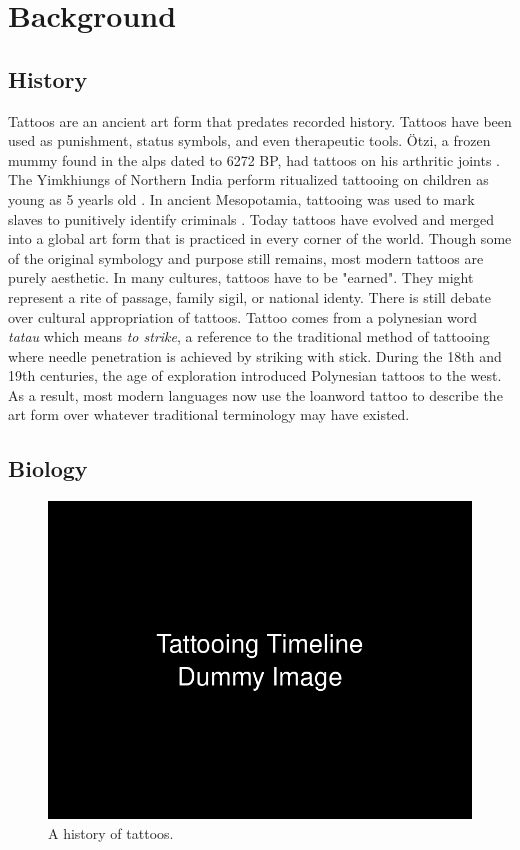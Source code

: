 \documentclass[11pt]{article}
\begin{document}
\section{Background}

\subsection{History}

Tattoos are an ancient art form that predates recorded history.
Tattoos have been used as punishment, status symbols, and even therapeutic tools.
Ötzi, a frozen mummy found in the alps dated to 6272 BP, had tattoos on his arthritic joints \cite{deterwolf_worlds_oldest}.
The Yimkhiungs of Northern India perform ritualized tattooing on children as young as 5 yearls old \cite{kluger2015cultural}.
In ancient Mesopotamia, tattooing was used to mark slaves to punitively identify criminals \cite{hawken2022tattooing}.
Today tattoos have evolved and merged into a global art form that is practiced in every corner of the world.
Though some of the original symbology and purpose still remains, most modern tattoos are purely aesthetic.
In many cultures, tattoos have to be "earned". They might represent a rite of passage, family sigil, or national identy. There is still debate over cultural appropriation of tattoos.
Tattoo comes from a polynesian word \textit{tatau} which means \textit{to strike}, a reference to the traditional method of tattooing where needle penetration is achieved by striking with stick.
During the 18th and 19th centuries, the age of exploration introduced Polynesian tattoos to the west.
As a result, most modern languages now use the loanword tattoo to describe the art form over whatever traditional terminology may have existed.

\subsection{Biology}

\begin{figure}
    \vspace{-20pt}
    \includegraphics[width=\linewidth]{figures/timeline.png}
    \caption{A history of tattoos.}
    \label{fig:timeline_biology}
\end{figure}
\end{document}
